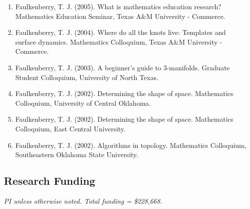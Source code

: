 \documentclass[article,10pt]{article}
\begin{document}
\begin{enumerate}
\item Faulkenberry, T. J. (2005). What is mathematics education research? Mathematics Education Seminar, Texas A\&M University - Commerce.
\item Faulkenberry, T. J. (2004). Where do all the knots live: Templates and surface dynamics. Mathematics Colloquium, Texas A\&M University - Commerce.
\item Faulkenberry, T. J. (2003). A beginner’s guide to 3-manifolds. Graduate Student Colloquium, University of North Texas.
\item Faulkenberry, T. J. (2002). Determining the shape of space. Mathematics Colloquium, University of Central Oklahoma.
\item Faulkenberry, T. J. (2002). Determining the shape of space. Mathematics Colloquium, East Central University.
\item Faulkenberry, T. J. (2002). Algorithms in topology. Mathematics Colloquium, Southeastern Oklahoma State University.
\end{enumerate}

\subsection*{Research Funding}
\label{sec:org9807ec9}

\emph{PI unless otherwise noted.  Total funding = \$228,668.}
\end{document}

